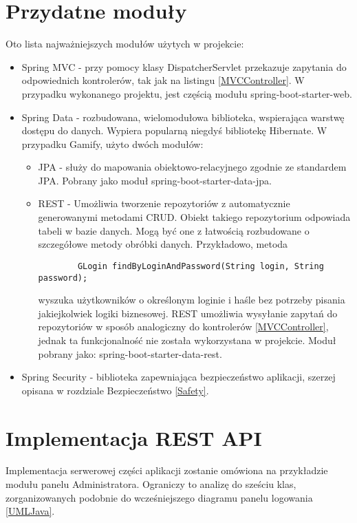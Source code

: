 \documentclass[a4paper,12pt,twoside,openany]{report}
\begin{document}
\section{Przydatne moduły}
Oto lista najważniejszych modułów użytych w projekcie:
\begin{itemize}
	\item Spring MVC - przy pomocy klasy DispatcherServlet przekazuje zapytania do odpowiednich kontrolerów, tak jak na listingu \ref{MVCController}. W przypadku wykonanego projektu, jest częścią modułu spring-boot-starter-web.
	\item Spring Data - rozbudowana, wielomodułowa biblioteka, wspierająca warstwę dostępu do danych. Wypiera popularną niegdyś bibliotekę Hibernate. W przypadku Gamify, użyto dwóch modułów:
	\begin{itemize}
		\item JPA - służy do mapowania obiektowo-relacyjnego zgodnie ze standardem JPA. Pobrany jako moduł spring-boot-starter-data-jpa.
		\item REST - Umożliwia tworzenie repozytoriów z automatycznie generowanymi metodami CRUD. Obiekt takiego repozytorium odpowiada tabeli w bazie danych. Mogą być one z łatwością rozbudowane o szczegółowe metody obróbki danych. Przykładowo, metoda 
		\begin{lstlisting}
		GLogin findByLoginAndPassword(String login, String password);
		\end{lstlisting}
		wyszuka użytkowników o określonym loginie i haśle bez potrzeby pisania jakiejkolwiek logiki biznesowej. REST umożliwia wysyłanie zapytań do repozytoriów w sposób analogiczny do kontrolerów \ref{MVCController}, jednak ta funkcjonalność nie została wykorzystana w projekcie. Moduł pobrany jako: spring-boot-starter-data-rest.
	\end{itemize}
	\item Spring Security - biblioteka zapewniająca bezpieczeństwo aplikacji, szerzej opisana w rozdziale Bezpieczeństwo \ref{Safety}.
\end{itemize}
\section{Implementacja REST API}
Implementacja serwerowej części aplikacji zostanie omówiona na przykładzie modułu panelu Administratora. Ograniczy to analizę do sześciu klas, zorganizowanych podobnie do wcześniejszego diagramu panelu logowania \ref{UMLJava}.
\end{document}

